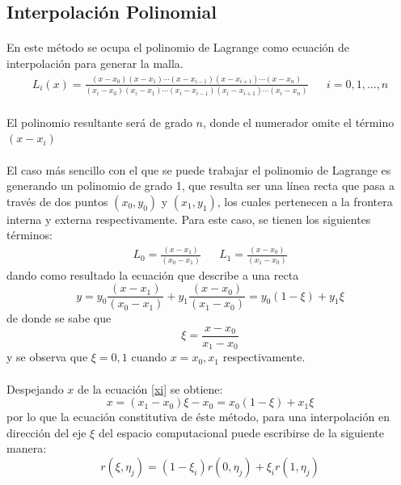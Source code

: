 \documentclass[letterpaper, openright, 12pt]{book}
\begin{document}
		\subsection{Interpolación Polinomial}\label{Lagrange}
			\paragraph*{}
				En este método se ocupa el polinomio de Lagrange como ecuación de interpolación para generar la malla.
				\begin{align}
					L_{i}(x) = \frac{ (x - x_{0} )(x - x_{1}) \dotsb (x - x_{i-1}) (x - x_{i+1}) \dotsb (x - x_{n}) }{(x_{i} - x_{0} )(x_{i} - x_{1}) \dotsb (x_{i} - x_{i-1}) (x_{i} - x_{i+1}) \dotsb (x_{i} - x_{n}) } && i = 0, 1, \dotsc , n
				\end{align}
				\\El polinomio resultante será de grado $n$, donde el numerador omite el término $(x - x_{i})$
			
			\paragraph*{}
				El caso más sencillo con el que se puede trabajar el polinomio de Lagrange es generando un polinomio de grado 1, que resulta ser una línea recta que pasa a través de dos puntos $(x_{0} , y_{0})$ y $(x_{1}, y_{1})$, los cuales pertenecen a la frontera interna y externa respectivamente. Para este caso, se tienen los siguientes términos:
				\begin{align*}
					L_{0} = \frac{ ( x - x_{1} ) }{ (x_{0} - x_{1} ) } && L_{1} = \frac{ ( x - x_{0} ) }{ (x_{1} - x_{0} ) }
				\end{align*}
				dando como resultado la ecuación que describe a una recta
				\begin{equation}
					y = y_{0} \frac{ ( x - x_{1} ) }{ ( x_{0} - x_{1} ) }  + y_{1} \frac{ (x - x_{0})  }{( x_{1} - x_{0} )} = y_{0} (1 - \xi) + y_{1}\xi
				\end{equation}
				de donde se sabe que
				\begin{equation}
					\xi = \frac{x - x_{0}}{x_{1} - x_{0}}
					\label{xi}
				\end{equation}
				y se observa que $\xi = 0, 1$ cuando $x = x_{0}, x_{1}$ respectivamente.
			\paragraph*{}
				Despejando $x$ de la ecuación \ref{xi} se obtiene:
				\begin{equation}
					x = (x_{1} - x_{0})\xi - x_{0} = x_{0}(1 - \xi) + x_{1}\xi
				\end{equation}
				por lo que la ecuación constitutiva de éste método, para una interpolación en dirección del eje $\xi$ del espacio computacional puede escribirse de la siguiente manera:
				\begin{equation}
					r(\xi, \eta_{j}) = (1 - \xi_{i}) r(0, \eta_{j}) + \xi_{i}r(1, \eta_{j})
				\end{equation}
				
\end{document}
